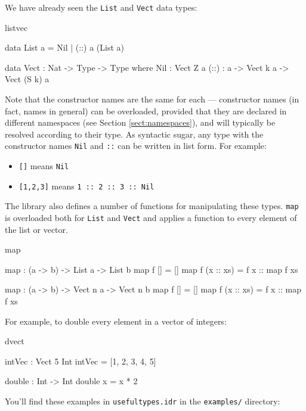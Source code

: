 We have already seen the \texttt{List} and \texttt{Vect} data types:

\begin{SaveVerbatim}{listvec}

data List a = Nil | (::) a (List a)

data Vect : Nat -> Type -> Type where
   Nil  : Vect Z a
   (::) : a -> Vect k a -> Vect (S k) a

\end{SaveVerbatim}

\noindent
Note that the constructor names are the same for each --- constructor names (in
fact, names in general) can be overloaded, provided that they are declared in
different namespaces (see Section \ref{sect:namespaces}), and will typically be
resolved according to their type. As syntactic sugar, any type with the constructor
names \texttt{Nil} and \texttt{::} can be written in list form. For example:

\begin{itemize}
\item \texttt{[]} means \texttt{Nil}
\item \texttt{[1,2,3]} means \texttt{1 :: 2 :: 3 :: Nil}
\end{itemize}

\noindent
The library also defines a number of functions for manipulating these types.
\texttt{map} is overloaded both for \texttt{List} and \texttt{Vect}
and applies a function to every element of the list or vector.

\begin{SaveVerbatim}{map}

map : (a -> b) -> List a -> List b
map f []        = []
map f (x :: xs) = f x :: map f xs

map : (a -> b) -> Vect n a -> Vect n b
map f []        = []
map f (x :: xs) = f x :: map f xs

\end{SaveVerbatim}

\noindent
For example, to double every element in a vector of integers:

\begin{SaveVerbatim}{dvect}

intVec : Vect 5 Int
intVec = [1, 2, 3, 4, 5]

double : Int -> Int
double x = x * 2

\end{SaveVerbatim}

\noindent
You'll find these examples in \texttt{usefultypes.idr} in the \texttt{examples/} directory:

